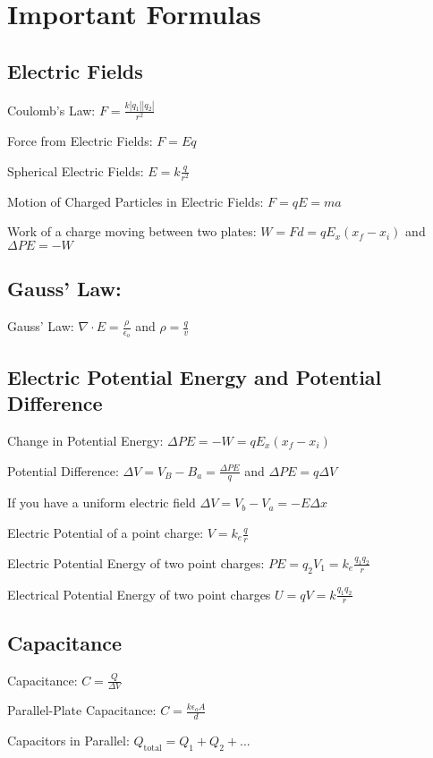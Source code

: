 \section{Important Formulas}
\subsection{Electric Fields}
Coulomb's Law: $F=\frac{k|q_1| |q_2|}{r^2}$

Force from Electric Fields: $F=Eq$

Spherical Electric Fields: $E=k\frac{q}{r^2}$

Motion of Charged Particles in Electric Fields: $F=qE=ma$

Work of a charge moving between two plates: $W=Fd=qE_x(x_f-x_i)$ and $\Delta PE = -W$

\subsection{Gauss' Law:}
Gauss' Law: $\nabla \cdot E = \frac{\rho}{\epsilon_o}$ and $\rho = \frac{q}{v}$

\subsection{Electric Potential Energy and Potential Difference}
Change in Potential Energy: $\Delta PE = -W = qE_x(x_f-x_i)$

Potential Difference: $\Delta V = V_B-B_a=\frac{\Delta PE}{q}$ and $\Delta PE = q\Delta V$

If you have a uniform electric field $\Delta V = V_b-V_a=-E\Delta x$

Electric Potential of a point charge: $V=k_e\frac{q}{r}$

Electric Potential Energy of two point charges: $PE=q_2V_1=k_e\frac{q_1q_2}{r}$

Electrical Potential Energy of two point charges $U=qV=k\frac{q_1q_2}{r}$

\subsection{Capacitance}
Capacitance: $C=\frac{Q}{\Delta V}$

Parallel-Plate Capacitance: $C=\frac{k\epsilon_oA}{d}$

Capacitors in Parallel: $Q_\text{total}=Q_1+Q_2+...$











